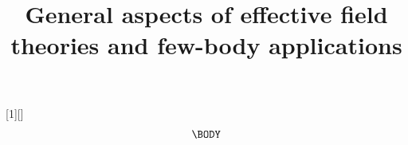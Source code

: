 \newcommand{\comm}[2]{[#1,#2]}
\newcommand{\commauto}[2]{\left[#1,#2\right]}
\newcommand{\commbig}[2]{\big[#1,#2\big]}

\newcommand{\acomm}[2]{\{#1,#2\}}
\newcommand{\acommauto}[2]{\left\{#1,#2\right\}}
\newcommand{\acommbig}[2]{\big\{#1,#2\big\}}

[1][]{%
\begin{subequations}\begin{align}
  \BODY
\end{align}\label{#1}\end{subequations}
}


\newcommand*{\vcenteredhbox}[1]
{\begingroup\setbox0=\hbox{#1}\parbox{\wd0}{\box0}\endgroup}


\newcommand{\ThreeSOne}{\ensuremath{{}^3S_1}\xspace}
\newcommand{\OneSNot}{\ensuremath{{}^1S_0}\xspace}

\newcommand{\Triton}{\ensuremath{{}^3\mathrm{H}}\xspace}
\newcommand{\ThreeH}{\Triton}
\newcommand{\ThreeHe}{\ensuremath{{}^3\mathrm{He}}\xspace}
\newcommand{\FourHe}{\ensuremath{{}^3\mathrm{He}}\xspace}
\newcommand{\SixHe}{\ensuremath{{}^6\mathrm{He}}\xspace}
\newcommand{\SixLi}{\ensuremath{{}^6\mathrm{Li}}\xspace}

\newcommand{\epspol}{\vec{\epsilon}_\gamma}

\newcommand{\epsgamma}{\vec{\epsilon}_{s_\gamma}}
\newcommand{\epsgammaout}{\vec{\epsilon}^{\;*}_{s_\gamma}}

\newcommand{\epsd}{\vec{\epsilon}_{s_d}}
\newcommand{\epsdout}{\vec{\epsilon}^{\;*}_{s_d}}


\newcommand{\y}{y}
\newcommand{\yt}{\ensuremath{\y_t}}
\newcommand{\ys}{\ensuremath{\y_s}}

\newcommand{\sigt}{\ensuremath{g_t}}
\newcommand{\sigs}{\ensuremath{g_s}}

\newcommand{\st}{\ensuremath{{s,t}}}
\newcommand{\yst}{\ensuremath{\y_\st}}
\newcommand{\sigst}{\ensuremath{g_\st}}

\title{General aspects of effective field theories and few-body applications}

